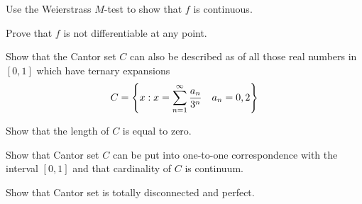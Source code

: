 \documentclass{../homework}
\begin{document}
\begin{problems}
\begin{problems}
  \item Use the Weierstrass \(M\)-test to show that \(f\) is
    continuous.

    \begin{solution}
    \end{solution}

  \item Prove that \(f\) is not differentiable at any point.

    \begin{solution}
    \end{solution}
  \end{problems}

\item
  \begin{problems}
  \item Show that the Cantor set \(C\) can also be described as of all
    those real numbers in \([0, 1]\) which have ternary expansions
    \[
      C = \cbr*{
        x : x = \sum_{n=1}^\infty \frac{a_n}{3^n}
        \quad a_n = 0, 2
      }
    \]

    \begin{solution}
    \end{solution}

  \item Show that the length of \(C\) is equal to zero.

    \begin{solution}
    \end{solution}

  \item Show that Cantor set \(C\) can be put into one-to-one
    correspondence with the interval \([0, 1]\) and that cardinality
    of \(C\) is continuum.

    \begin{solution}
    \end{solution}

  \item Show that Cantor set is totally disconnected and perfect.

    \begin{solution}
    \end{solution}
  \end{problems}
\end{problems}
\end{document}
